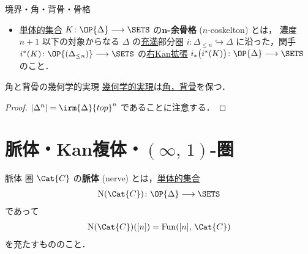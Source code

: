 \documentclass[TQFT_main]{subfiles}
\begin{document}
\begin{mydef}[label=def:horn,breakable]{境界・角・背骨・骨格}
\begin{itemize}
        \item \hyperref[def:simplicial-sets]{単体的集合} $K \colon \OP{\Delta} \lto \SETS$ の\textbf{$\bm{n}$-余骨格} ($n$-coskelton) とは，
        濃度 $n+1$ 以下の対象からなる $\Delta$ の\hyperref[def:faithful]{充満}部分圏 $i \colon \Delta_{\le n} \hookrightarrow \Delta$ に沿った，関手 $i^*(K) \colon \OP{(\Delta_{\le n})} \lto \SETS$ の\hyperref[def:Kanext]{右Kan拡張} $i_* \bigl(i^* (K)\bigr) \colon \OP{\Delta} \lto \SETS$ のこと．
    \end{itemize}
    
\end{mydef}

\begin{myprop}[label=prop:horn-spine-basic]{角と背骨の幾何学的実現}
    \hyperref[def:geometric-realization]{幾何学的実現}は\hyperref[def:horn]{角，背骨}を保つ．
\end{myprop}

\begin{proof}
    $\abs{\Delta^n} = \irm{\Delta}{top}^n$ であることに注意する．
\end{proof}

\section{脈体・Kan複体・$(\infty,\, 1)$-圏}

\begin{mydef}[label=def:nerve]{脈体}
    圏 $\Cat{C}$ の\textbf{脈体} (nerve) とは，\hyperref[def:simplicial-sets]{単体的集合}
    \begin{align}
        \mathrm{N}(\Cat{C}) \colon \OP{\Delta} \lto \SETS
    \end{align}
    であって
    \begin{align}
        \mathrm{N}(\Cat{C}) ([n]) = \mathrm{Fun} ([n],\, \Cat{C})
    \end{align}
    を充たすもののこと．
\end{mydef}
\end{document}

